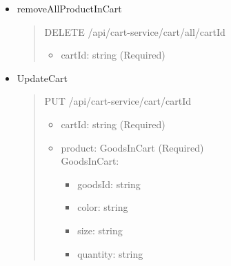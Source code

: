 \begin{itemize}
	\item removeAllProductInCart
	      \begin{quote}
		      DELETE /api/cart-service/cart/all/{cartId}
		      \begin{itemize}
			      \item cartId: string (Required)
		      \end{itemize}
	      \end{quote}

	\item UpdateCart
	      \begin{quote}
		      PUT /api/cart-service/cart/{cartId}
		      \begin{itemize}
			      \item cartId: string (Required)
			      \item product: GoodsInCart (Required)\\
			            GoodsInCart:
			            \begin{itemize}
				            \item goodsId: string
				            \item color: string
				            \item size: string
				            \item quantity: string
			            \end{itemize}
		      \end{itemize}
	      \end{quote}
\end{itemize}

